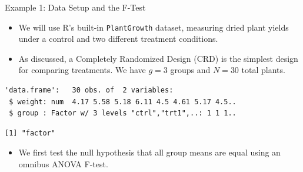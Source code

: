 \begin{frame}{Example 1: Data Setup and the F-Test}
  \begin{itemize}
    \item We will use R's built-in \texttt{PlantGrowth} dataset, measuring dried plant yields under a control and two different treatment conditions.
    \item As discussed, a Completely Randomized Design (CRD) is the simplest design for comparing treatments. We have $g=3$ groups and $N=30$ total plants.
  \end{itemize}
  
\begin{knitrout}\small
{}\color{fgcolor}\begin{kframe}
\begin{alltt}
\end{alltt}
\begin{verbatim}
'data.frame':	30 obs. of  2 variables:
 $ weight: num  4.17 5.58 5.18 6.11 4.5 4.61 5.17 4.5..
 $ group : Factor w/ 3 levels "ctrl","trt1",..: 1 1 1..
\end{verbatim}
\begin{alltt}
\hlopt{$}
\end{alltt}
\begin{verbatim}
[1] "factor"
\end{verbatim}
\end{kframe}
\end{knitrout}

  \framebreak
  
  \begin{itemize}
    \item We first test the null hypothesis that all group means are equal using an omnibus ANOVA F-test.
  \end{itemize}

\begin{knitrout}\scriptsize
{}\color{fgcolor}\begin{kframe}
\begin{alltt}
 \hlkwb{<-}  \hlopt{~}   


\end{alltt}
\end{kframe}
\end{knitrout}
\end{frame}

